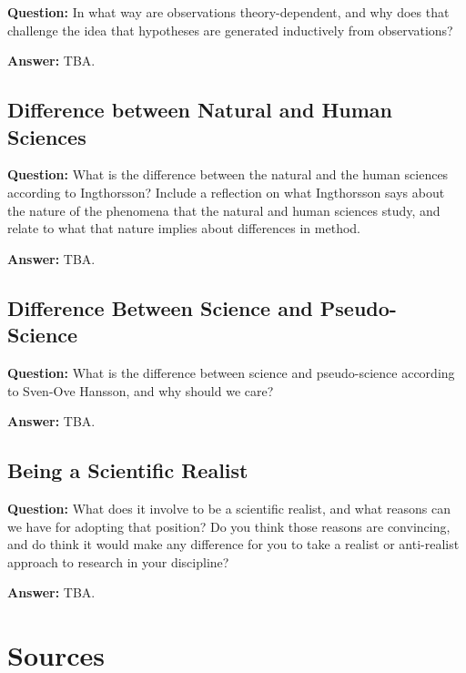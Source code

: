 \documentclass[11pt]{scrartcl}
\begin{document}
\textbf{Question:} In what way are observations theory-dependent, and why does that challenge the idea that hypotheses are generated inductively from observations?

\bigbreak

\textbf{Answer:} TBA.

\subsection{Difference between Natural and Human Sciences}

\textbf{Question:} What is the difference between the natural and the human sciences according to Ingthorsson? Include a reflection on what Ingthorsson says about the nature of the phenomena that the natural and human sciences study, and relate to what that nature implies about differences in method.

\bigbreak

\textbf{Answer:} TBA.

\subsection{Difference Between Science and Pseudo-Science}

\textbf{Question:} What is the difference between science and pseudo-science according to Sven-Ove Hansson, and why should we care?

\bigbreak

\textbf{Answer:} TBA.

\subsection{Being a Scientific Realist}

\textbf{Question:} What does it involve to be a scientific realist, and what reasons can we have for adopting that position? Do you think those reasons are convincing, and do think it would make any difference for you to take a realist or anti-realist approach to research in your discipline?

\bigbreak

\textbf{Answer:} TBA.

\section{Sources}



\end{document}
